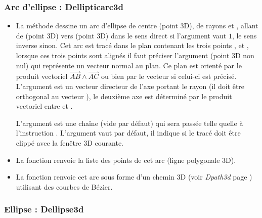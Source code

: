 \subsubsection{Arc d'ellipse : Dellipticarc3d}
 
\begin{itemize}
    \item La méthode  dessine un arc d'ellipse de centre  (point 3D), de rayons  et , allant de  (point 3D) vers  (point 3D) dans le sens direct si l'argument  vaut $1$, le sens inverse sinon. Cet arc est tracé dans le plan contenant les trois points ,  et , lorsque ces trois points sont alignés il faut préciser l'argument  (point 3D non nul) qui représente un vecteur normal au plan. Ce plan est orienté par le produit vectoriel $\vec{AB}\wedge\vec{AC}$ ou bien par le vecteur  si celui-ci est précisé. L'argument  est un vecteur directeur de l'axe portant le rayon  (il doit être orthogonal au vecteur ), le deuxième axe est déterminé par le produit vectoriel entre  et .
    
    L'argument  est une chaîne (vide par défaut) qui sera passée telle quelle à l'instruction \drawcmd . L'argument  vaut \false par défaut, il indique si le tracé doit être clippé avec la fenêtre 3D courante.
    
    \item La fonction  renvoie la liste des points de cet arc (ligne polygonale 3D). 
    
    \item La fonction  renvoie cet arc sous forme d'un chemin 3D (voir \emph{Dpath3d} page \pageref{Dpath3d}) utilisant des courbes de Bézier.
\end{itemize}

\subsubsection{Ellipse : Dellipse3d}

